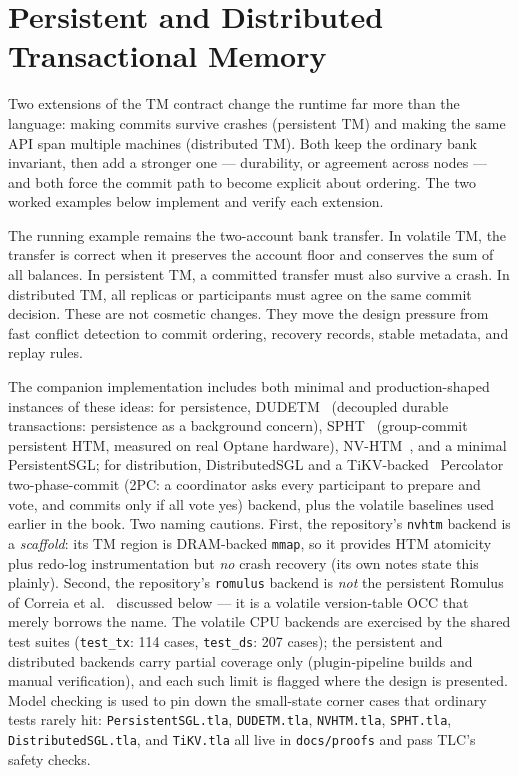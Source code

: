 \chapter{Persistent and Distributed Transactional Memory}

Two extensions of the TM contract change the runtime far more than the
language: making commits survive crashes (persistent TM) and making the
same API span multiple machines (distributed TM). Both keep the ordinary
bank invariant, then add a stronger one --- durability, or agreement across
nodes --- and both force the commit path to become explicit about ordering.
The two worked examples below implement and verify each extension.

The running example remains the two-account bank transfer. In volatile TM,
the transfer is correct when it preserves the account floor and conserves the
sum of all balances. In persistent TM, a committed transfer must also survive
a crash. In distributed TM, all replicas or participants must agree on the same
commit decision. These are not cosmetic changes. They move the design pressure
from fast conflict detection to commit ordering, recovery records, stable
metadata, and replay rules.

The companion implementation includes both minimal and production-shaped
instances of these ideas: for persistence, DUDETM~\cite{liu17dudetm}
(decoupled durable transactions: persistence as a background concern),
SPHT~\cite{castro21spht} (group-commit persistent HTM, measured on real
Optane hardware), NV-HTM~\cite{castro18nvhtm}, and a minimal PersistentSGL;
for distribution, DistributedSGL and a TiKV-backed~\cite{peng10percolator}
Percolator two-phase-commit (2PC: a coordinator asks every participant to
prepare and vote, and commits only if all vote yes) backend, plus the
volatile baselines used earlier
in the book. Two naming cautions. First, the repository's \texttt{nvhtm}
backend is a \emph{scaffold}: its TM region is DRAM-backed \texttt{mmap}, so
it provides HTM atomicity plus redo-log instrumentation but \emph{no} crash
recovery (its own notes state this plainly). Second, the repository's
\texttt{romulus} backend is \emph{not} the persistent Romulus of Correia et
al.~\cite{correia18romulus} discussed below --- it is a volatile
version-table OCC that merely borrows the name. The volatile CPU backends are
exercised by the shared test suites (\texttt{test\_tx}: 114 cases,
\texttt{test\_ds}: 207 cases); the persistent and distributed backends carry
partial coverage only (plugin-pipeline builds and manual verification), and
each such limit is flagged where the design is presented. Model checking is
used to pin down the small-state corner cases that ordinary tests rarely hit:
\texttt{PersistentSGL.tla}, \texttt{DUDETM.tla}, \texttt{NVHTM.tla},
\texttt{SPHT.tla}, \texttt{DistributedSGL.tla}, and \texttt{TiKV.tla} all
live in \texttt{docs/proofs} and pass TLC's safety checks.

